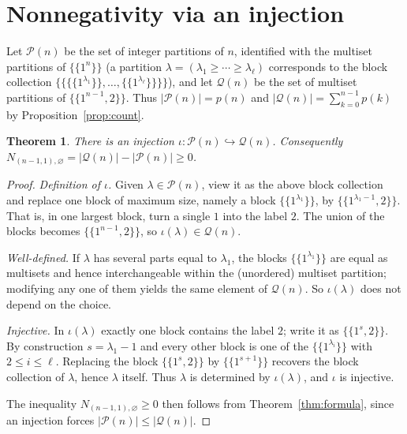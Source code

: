 \documentclass[11pt]{article}
\newtheorem{theorem}{Theorem}
\theoremstyle{remark}
\newcommand{\ones}[1]{1^{#1}}
\begin{document}
\section{Nonnegativity via an injection}

Let $\mathcal{P}(n)$ be the set of integer partitions of $n$, identified with the
multiset partitions of $\{\!\{\ones{n}\}\!\}$ (a partition
$\lambda=(\lambda_1\ge\cdots\ge\lambda_\ell)$ corresponds to the block collection
$\{\!\{\{\!\{\ones{\lambda_1}\}\!\},\dots,\{\!\{\ones{\lambda_\ell}\}\!\}\}\!\}$),
and let $\mathcal{Q}(n)$ be the set of multiset partitions of
$\{\!\{\ones{n-1},2\}\!\}$. Thus $|\mathcal{P}(n)|=p(n)$ and
$|\mathcal{Q}(n)|=\sum_{k=0}^{n-1}p(k)$ by Proposition~\ref{prop:count}.

\begin{theorem}\label{thm:inj}
There is an injection $\iota:\mathcal{P}(n)\hookrightarrow\mathcal{Q}(n)$.
Consequently $N_{(n-1,1),\varnothing}=|\mathcal{Q}(n)|-|\mathcal{P}(n)|\ge 0$.
\end{theorem}

\begin{proof}
\emph{Definition of $\iota$.} Given $\lambda\in\mathcal{P}(n)$, view it as the
above block collection and replace one block of maximum size, namely a block
$\{\!\{\ones{\lambda_1}\}\!\}$, by $\{\!\{\ones{\lambda_1-1},2\}\!\}$. That is,
in one largest block, turn a single $1$ into the label $2$. The union of the
blocks becomes $\{\!\{\ones{n-1},2\}\!\}$, so $\iota(\lambda)\in\mathcal{Q}(n)$.

\emph{Well-defined.} If $\lambda$ has several parts equal to $\lambda_1$, the
blocks $\{\!\{\ones{\lambda_1}\}\!\}$ are equal as multisets and hence
interchangeable within the (unordered) multiset partition; modifying any one of
them yields the same element of $\mathcal{Q}(n)$. So $\iota(\lambda)$ does not
depend on the choice.

\emph{Injective.} In $\iota(\lambda)$ exactly one block contains the label $2$;
write it as $\{\!\{\ones{s},2\}\!\}$. By construction $s=\lambda_1-1$ and every
other block is one of the $\{\!\{\ones{\lambda_i}\}\!\}$ with $2\le i\le\ell$.
Replacing the block $\{\!\{\ones{s},2\}\!\}$ by $\{\!\{\ones{s+1}\}\!\}$ recovers
the block collection of $\lambda$, hence $\lambda$ itself. Thus $\lambda$ is
determined by $\iota(\lambda)$, and $\iota$ is injective.

The inequality $N_{(n-1,1),\varnothing}\ge 0$ then follows from
Theorem~\ref{thm:formula}, since an injection forces
$|\mathcal{P}(n)|\le|\mathcal{Q}(n)|$.
\end{proof}
\end{document}
